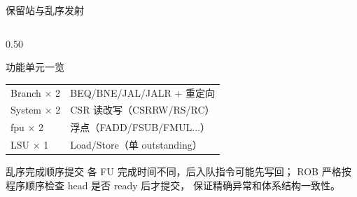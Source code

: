 \documentclass[aspectratio=169,xcolor={dvipsnames,svgnames},10pt]{beamer}
\begin{document}
\begin{frame}[shrink=15]{保留站与乱序发射}
\begin{columns}[T]
\begin{column}{0.50\textwidth}
\begin{block}{功能单元一览}
{\begin{tabular}{lp{5.0cm}}
          Branch $\times$ 2    & BEQ/BNE/JAL/JALR + 重定向 \\
          System $\times$ 2    & CSR 读改写（CSRRW/RS/RC）\\
          fpu $\times$ 2 & 浮点（FADD/FSUB/FMUL...）\\
          LSU $\times$ 1       & Load/Store（单 outstanding）\\
          \bottomrule
        \end{tabular}}
      \end{block}
      \vspace{0.15cm}
      \begin{exampleblock}{乱序完成顺序提交}
        \small 各 FU 完成时间不同，后入队指令可能先写回；
        ROB 严格按程序顺序检查 head 是否 ready 后才提交，
        保证精确异常和体系结构一致性。
      \end{exampleblock}
    \end{column}
  \end{columns}
\end{frame}
\end{document}
